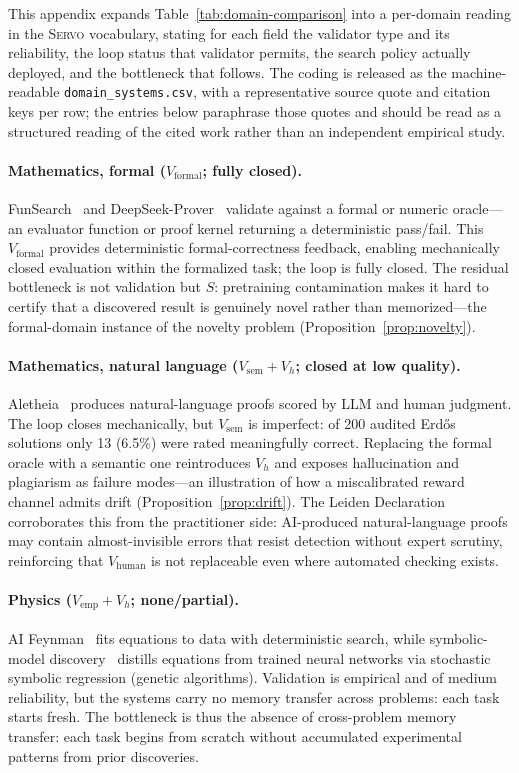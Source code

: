 \documentclass{article}
\newcommand{\framework}{\textsc{Servo}}
\begin{document}
This appendix expands Table~\ref{tab:domain-comparison} into a per-domain reading in the \framework{} vocabulary, stating for each field the validator type and its reliability, the loop status that validator permits, the search policy actually deployed, and the bottleneck that follows. The coding is released as the machine-readable \texttt{domain\_systems.csv}, with a representative source quote and citation keys per row; the entries below paraphrase those quotes and should be read as a structured reading of the cited work rather than an independent empirical study.

\paragraph{Mathematics, formal ($V_\text{formal}$; fully closed).} FunSearch~\citep{romera2023funsearch} and DeepSeek-Prover~\citep{xin2024deepseek} validate against a formal or numeric oracle---an evaluator function or proof kernel returning a deterministic pass/fail. This $V_\text{formal}$ provides deterministic formal-correctness feedback, enabling mechanically closed evaluation within the formalized task; the loop is fully closed. The residual bottleneck is not validation but $S$: pretraining contamination makes it hard to certify that a discovered result is genuinely novel rather than memorized---the formal-domain instance of the novelty problem (Proposition~\ref{prop:novelty}).

\paragraph{Mathematics, natural language ($V_\text{sem}+V_h$; closed at low quality).} Aletheia~\citep{google2026aletheia} produces natural-language proofs scored by LLM and human judgment. The loop closes mechanically, but $V_\text{sem}$ is imperfect: of 200 audited Erd\H{o}s solutions only 13 (6.5\%) were rated meaningfully correct. Replacing the formal oracle with a semantic one reintroduces $V_h$ and exposes hallucination and plagiarism as failure modes---an illustration of how a miscalibrated reward channel admits drift (Proposition~\ref{prop:drift}). The Leiden Declaration~\citep{leiden2026} corroborates this from the practitioner side: AI-produced natural-language proofs may contain almost-invisible errors that resist detection without expert scrutiny, reinforcing that $V_\text{human}$ is not replaceable even where automated checking exists.

\paragraph{Physics ($V_\text{emp}+V_h$; none/partial).} AI Feynman~\citep{udrescu2020afeynman} fits equations to data with deterministic search, while symbolic-model discovery~\citep{cranmer2020symbolic} distills equations from trained neural networks via stochastic symbolic regression (genetic algorithms). Validation is empirical and of medium reliability, but the systems carry no memory transfer across problems: each task starts fresh. The bottleneck is thus the absence of cross-problem memory transfer: each task begins from scratch without accumulated experimental patterns from prior discoveries.
\end{document}

